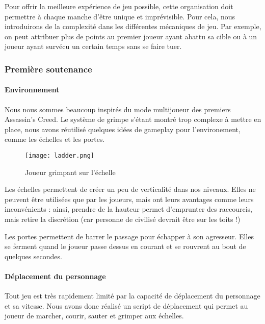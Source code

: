 			Pour offrir la meilleure expérience de jeu possible, cette organisation doit permettre à chaque manche d'être unique et imprévisible.
			Pour cela, nous introduirons de la complexité dans les différentes mécaniques de jeu. Par exemple, on peut attribuer plus de points
			au premier joueur ayant abattu sa cible ou à un joueur ayant survécu un certain temps sans se faire tuer.


			
	\subsubsection{Première soutenance}

        \paragraph{Environnement}

            Nous nous sommes beaucoup inspirés du mode multijoueur des premiers Assassin's Creed. Le système de grimpe s'étant 
			montré trop complexe à mettre en place, nous avons réutilisé quelques idées de gameplay pour l'environement, comme les échelles et les portes.

            \begin{figure}[hbt!]
                \centering
                \texttt{[image: ladder.png]}
                \caption{Joueur grimpant sur l'échelle}
            \end{figure}
			\FloatBarrier

            Les échelles permettent de créer un peu de verticalité dans nos niveaux.
            Elles ne peuvent être utilisées que par les joueurs, mais ont leurs avantages comme leurs inconvénients : ainsi,
            prendre de la hauteur permet d'emprunter des raccourcis, mais retire la discrétion (car personne de civilisé devrait être sur les toits !)
            
            Les portes permettent de barrer le passage pour échapper à son agresseur.
            Elles se ferment quand le joueur passe dessus en courant
            et se rouvrent au bout de quelques secondes.



        \paragraph{Déplacement du personnage}
            
            Tout jeu est très rapidement limité par la capacité de déplacement du personnage et sa vitesse.
            Nous avons donc réalisé un script de déplacement qui permet au joueur de marcher, courir, sauter et grimper aux échelles.

